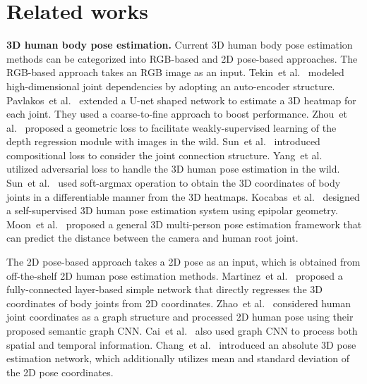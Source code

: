 \documentclass[runningheads]{llncs}
\begin{document}
 \section{Related works}

\iffalse
\noindent \textbf{3D human body pose estimation.}
Current 3D human body pose estimation methods can be categorized into RGB-based and 2D pose-based approaches.
The RGB-based approach takes an RGB image as an input. 
Tekin~et al.~\cite{tekin2016structured} modeled high-dimensional joint dependencies by adopting an auto-encoder structure. 
Pavlakos~et al.~\cite{pavlakos2017coarse} extended a U-net shaped network to estimate a 3D heatmap for each joint. They used a coarse-to-fine approach to boost performance.
Zhou~et al.~\cite{zhou2017weaklysupervised} proposed a geometric loss to facilitate weakly-supervised learning of the depth regression module with images in the wild. 
Sun~et al.~\cite{sun2017compositional} introduced compositional loss to consider the joint connection structure.
Yang~et al.~\cite{yang20183d} utilized adversarial loss to handle the 3D human pose estimation in the wild.
Sun~et al.~\cite{sun2018integral} used soft-argmax operation to obtain the 3D coordinates of body joints in a differentiable manner from the 3D heatmaps.
Kocabas~et al.~\cite{kocabas2019self} designed a self-supervised 3D human pose estimation system using epipolar geometry.
Moon~et al.~\cite{moon2019camera} proposed a general 3D multi-person pose estimation framework that can predict the distance between the camera and human root joint. 

The 2D pose-based approach takes a 2D pose as an input, which is obtained from off-the-shelf 2D human pose estimation methods. 
Martinez~et al.~\cite{martinez2017simple} proposed a fully-connected layer-based simple network that directly regresses the 3D coordinates of body joints from 2D coordinates. 
Zhao~et al.~\cite{zhao2019semantic} considered human joint coordinates as a graph structure and processed 2D human pose using their proposed semantic graph CNN. 
Cai~et al.~\cite{cai2019exploiting} also used graph CNN to process both spatial and temporal information. 
Chang~et al.~\cite{chang2019absposelifter} introduced an absolute 3D pose estimation network, which additionally utilizes mean and standard deviation of the 2D pose coordinates. 
\end{document}
